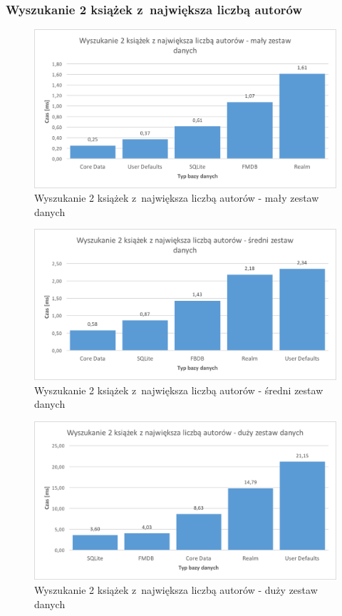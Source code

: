 \subsubsection{Wyszukanie 2 książek z~największa liczbą autorów}

\begin{figure}[H]
\centering
	\includegraphics[width=15cm]{img/read_data/read_by_books/read_by_books_small_test.png}
	\caption{Wyszukanie 2 książek z~największa liczbą autorów - mały zestaw danych}
	\label{fig: read-by-books-small}
\end{figure}

\begin{figure}[H]
\centering
	\includegraphics[width=15cm]{img/read_data/read_by_books/read_by_books_medium_test.png}
	\caption{Wyszukanie 2 książek z~największa liczbą autorów - średni zestaw danych}
	\label{fig: read-by-books-medium}
\end{figure}

\begin{figure}[H]
\centering
	\includegraphics[width=15cm]{img/read_data/read_by_books/read_by_books_big_test.png}
	\caption{Wyszukanie 2 książek z~największa liczbą autorów - duży zestaw danych}
	\label{fig: read-by-books-big}
\end{figure}

